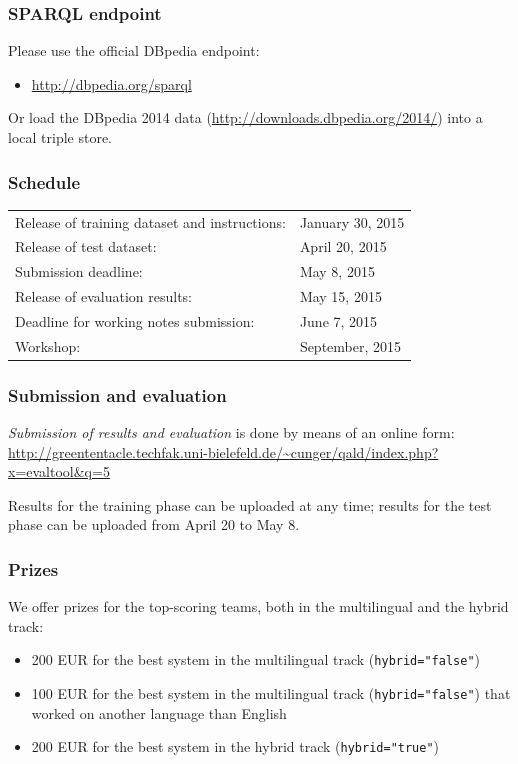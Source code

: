 \documentclass[a4paper]{article}
\begin{document}
{\subsubsection*{SPARQL endpoint}

Please use the official DBpedia endpoint:
\begin{itemize}
\item[] \url{http://dbpedia.org/sparql}
\end{itemize}
Or load the DBpedia 2014 data (\url{http://downloads.dbpedia.org/2014/}) into a local triple store.

\subsubsection*{Schedule}

\begin{tabular}{ll}
Release of training dataset and instructions: & January 30, 2015 \\
Release of test dataset: & April 20, 2015 \\
Submission deadline: & May 8, 2015 \\
Release of evaluation results: & May 15, 2015 \\
Deadline for working notes submission: & June 7, 2015 \\
Workshop: & September, 2015 \\
\end{tabular}

\subsubsection*{Submission and evaluation}

{\em Submission of results and evaluation} is done by means of an online form:\\
\url{http://greententacle.techfak.uni-bielefeld.de/~cunger/qald/index.php?x=evaltool&q=5}

Results for the training phase can be uploaded at any time; results for the test phase can be uploaded from April 20 to May 8.

\subsubsection*{Prizes}

We offer prizes for the top-scoring teams, both in the multilingual and the hybrid track: 
\begin{itemize}
\item 200 EUR for the best system in the multilingual track (\texttt{hybrid="false"})
\item 100 EUR for the best system in the multilingual track (\texttt{hybrid="false"}) that worked on another language than English  
\item 200 EUR for the best system in the hybrid track (\texttt{hybrid="true"})
\end{itemize}

}
\end{document}
